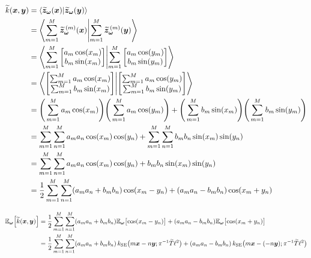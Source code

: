 \begin{figure*}
\begin{align}
    \tilde{k}(\vec{x}, \vec{y})
        &= \ip{\tilde{\vec{z}}_{\vec{\omega}}(\vec{x})}{\tilde{\vec{z}}_{\vec{\omega}}(\vec{y})} \\
        &= \ip{\sum_{m = 1}^{M} \tilde{\vec{z}}_{\vec{\omega}}^{\,(m)}(\vec{x})}{\sum_{m = 1}^{M} \tilde{\vec{z}}_{\vec{\omega}}^{\,(m)}(\vec{y})} \\
        &= \ip{\sum_{m = 1}^{M}  \begin{bmatrix} a_m \cos(x_m) \\ b_m \sin(x_m) \end{bmatrix}}{\sum_{m = 1}^{M} \begin{bmatrix} a_m \cos(y_m) \\ b_m \sin(y_m) \end{bmatrix}} \\
        &= \ip{\begin{bmatrix} \sum_{m = 1}^{M} a_m \cos(x_m) \\ \sum_{m = 1}^{M} b_m \sin(x_m) \end{bmatrix}}{\begin{bmatrix} \sum_{m = 1}^{M} a_m \cos(y_m) \\ \sum_{m = 1}^{M} b_m \sin(y_m) \end{bmatrix}} \\
        &= \Biggl(\, \sum_{m = 1}^{M} a_m \cos(x_m) \Biggr) \Biggl(\, \sum_{m = 1}^{M} a_m \cos(y_m) \Biggr) + \Biggl(\, \sum_{m = 1}^{M} b_m \sin(x_m) \Biggr) \Biggl(\, \sum_{m = 1}^{M} b_m \sin(y_m) \Biggr) \\
        &= \sum_{m = 1}^{M} \sum_{n = 1}^{M} a_m a_n \cos(x_m) \cos(y_n) + \sum_{m = 1}^{M} \sum_{n = 1}^{M} b_m b_n \sin(x_m) \sin(y_n) \\
        &= \sum_{m = 1}^{M} \sum_{n = 1}^{M} a_m a_n \cos(x_m) \cos(y_n) + b_m b_n \sin(x_m) \sin(y_n) \\
        &= \frac{1}{2} \sum_{m = 1}^{M} \sum_{n = 1}^{M} (a_m a_n + b_m b_n) \cos(x_m - y_n) + (a_m a_n - b_m b_n) \cos(x_m + y_n) \\
\end{align}

\begin{align}
    \mathbb{E}_{\bm{\omega}}\Bigl[ \widetilde{k}(\bm{x}, \bm{y}) \Bigr]
        &= \frac{1}{2} \sum_{m = 1}^{M} \sum_{n = 1}^{M} (a_m a_n + b_m b_n) \mathbb{E}_{\bm{\omega}}\bigl[ \cos(x_m - y_n) \bigr] + (a_m a_n - b_m b_n) \mathbb{E}_{\bm{\omega}}\bigl[ \cos(x_m + y_n) \bigr] \\
        &= \frac{1}{2} \sum_{m = 1}^{M} \sum_{n = 1}^{M} (a_m a_n + b_m b_n) \, k_\mathrm{SE}\bigl( m \bm{x} - n \bm{y}; \pi^{-1} \widetilde{T} \ell^2 \bigr) + (a_m a_n - b_m b_n) \, k_\mathrm{SE}\bigl( m \bm{x} - (-n \bm{y}); \pi^{-1} \widetilde{T} \ell^2 \bigr) \\
\end{align}


\end{figure*}
